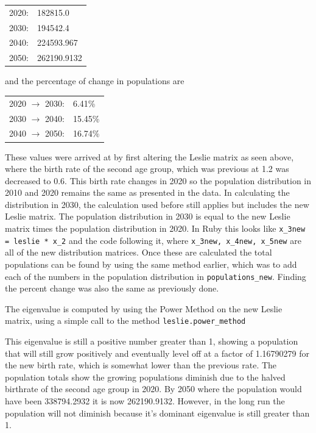\documentclass[letterpaper,12pt]{article}
\begin{document}
\vspace{11pt}

\begin{tabular}{l l}
2020: & 182815.0 \\
2030: & 194542.4 \\
2040: & 224593.967 \\
2050: & 262190.9132
\end{tabular}

\vspace{11pt}

and the percentage of change in populations are

\vspace{11pt}

\begin{tabular}{l l}
2020 $\to$ 2030: & 6.41\% \\
2030 $\to$ 2040: & 15.45\% \\
2040 $\to$ 2050: & 16.74\%
\end{tabular}

\vspace{11pt}

These values were arrived at by first altering the Leslie matrix as seen above, where
the birth rate of the second age group, which was previous at 1.2 was decreased to 0.6.
This birth rate changes in 2020 so the population distribution in 2010 and 2020 remains the same as
presented in the data.
In calculating the distribution in 2030, the calculation used before still applies but includes the
new Leslie matrix.
The population distribution in 2030 is equal to the new Leslie matrix times the population
distribution in 2020.
In Ruby this looks like \texttt{x\_3new = leslie * x\_2} and the code following it,
where \texttt{x\_3new, x\_4new, x\_5new} are all of the new distribution matrices.
Once these are calculated the total populations can be found by using the same method earlier,
which was to add each of the numbers in the population distribution in \texttt{populations\_new}.
Finding the percent change was also the same as previously done. 

The eigenvalue is computed by using the Power Method on the new Leslie matrix, using a simple call to the method \texttt{leslie.power\_method}

This eigenvalue is still a positive number greater than 1, showing a population that will still grow positively and eventually
level off at a factor of 1.16790279 for the new birth rate, which is somewhat lower than the previous rate.
The population totals show the growing populations diminish due to the halved birthrate of the second age group in 2020. By
2050 where the population would have been 338794.2932 it is now 262190.9132.
However, in the long run the population will not diminish because it's dominant eigenvalue is still greater than 1.
\end{document}
